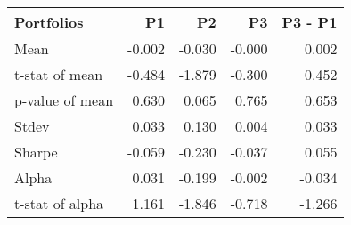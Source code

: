 \begin{tabular}{lrrrr}
\toprule
Portfolios & P1 & P2 & P3 & P3 - P1 \\
\midrule
Mean & -0.002 & -0.030 & -0.000 & 0.002 \\
t-stat of mean & -0.484 & -1.879 & -0.300 & 0.452 \\
p-value of mean & 0.630 & 0.065 & 0.765 & 0.653 \\
Stdev & 0.033 & 0.130 & 0.004 & 0.033 \\
Sharpe & -0.059 & -0.230 & -0.037 & 0.055 \\
Alpha & 0.031 & -0.199 & -0.002 & -0.034 \\
t-stat of alpha & 1.161 & -1.846 & -0.718 & -1.266 \\
\bottomrule
\end{tabular}
